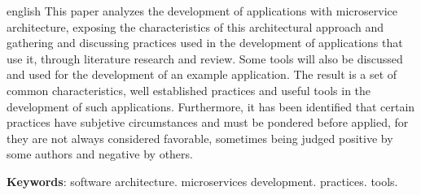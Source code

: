 \setlength{\absparsep}{18pt} %
\begin{resumo}[Abstract]
 \begin{otherlanguage*}{english}
   This paper analyzes the development of applications with microservice architecture, exposing the characteristics of this architectural approach and gathering and discussing practices used in the development of applications that use it, through literature research and review. Some tools will also be discussed and used for the development of an example application. The result is a set of common characteristics, well established practices and useful tools in the development of such applications. Furthermore, it has been identified that certain practices have subjetive circumstances and must be pondered before applied, for they are not always considered favorable, sometimes being judged positive by some authors and negative by others.
   

   \vspace{\onelineskip}
 
   \noindent 
   \textbf{Keywords}: software architecture. microservices development. practices. tools.
 \end{otherlanguage*}
\end{resumo}